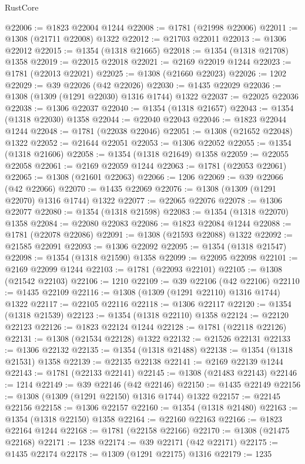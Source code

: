 \begin{lexlean}{RustCore}
\begin{coremodule}
@22006 := @1823 @22004 @1244
@22008 := @1781 (@21998 @22006)
@22011 := @1308 (@21711 @22008) @1322
@22012 := @21703 @22011
@22013 := @1306 @22012
@22015 := @1354 (@1318 @21665)
@22018 := @1354 (@1318 @21708) @1358
@22019 := @22015 @22018
@22021 := @2169 @22019 @1244
@22023 := @1781 (@22013 @22021)
@22025 := @1308 (@21660 @22023)
@22026 := 1202
@22029 := @39 @22026 (@42 @22026)
@22030 := @1435 @22029
@22036 := @1308 (@1309 (@1291 @22030) @1316 @1744) @1322
@22037 := @22025 @22036
@22038 := @1306 @22037
@22040 := @1354 (@1318 @21657)
@22043 := @1354 (@1318 @22030) @1358
@22044 := @22040 @22043
@22046 := @1823 @22044 @1244
@22048 := @1781 (@22038 @22046)
@22051 := @1308 (@21652 @22048) @1322
@22052 := @21644 @22051
@22053 := @1306 @22052
@22055 := @1354 (@1318 @21606)
@22058 := @1354 (@1318 @21649) @1358
@22059 := @22055 @22058
@22061 := @2169 @22059 @1244
@22063 := @1781 (@22053 @22061)
@22065 := @1308 (@21601 @22063)
@22066 := 1206
@22069 := @39 @22066 (@42 @22066)
@22070 := @1435 @22069
@22076 := @1308 (@1309 (@1291 @22070) @1316 @1744) @1322
@22077 := @22065 @22076
@22078 := @1306 @22077
@22080 := @1354 (@1318 @21598)
@22083 := @1354 (@1318 @22070) @1358
@22084 := @22080 @22083
@22086 := @1823 @22084 @1244
@22088 := @1781 (@22078 @22086)
@22091 := @1308 (@21593 @22088) @1322
@22092 := @21585 @22091
@22093 := @1306 @22092
@22095 := @1354 (@1318 @21547)
@22098 := @1354 (@1318 @21590) @1358
@22099 := @22095 @22098
@22101 := @2169 @22099 @1244
@22103 := @1781 (@22093 @22101)
@22105 := @1308 (@21542 @22103)
@22106 := 1210
@22109 := @39 @22106 (@42 @22106)
@22110 := @1435 @22109
@22116 := @1308 (@1309 (@1291 @22110) @1316 @1744) @1322
@22117 := @22105 @22116
@22118 := @1306 @22117
@22120 := @1354 (@1318 @21539)
@22123 := @1354 (@1318 @22110) @1358
@22124 := @22120 @22123
@22126 := @1823 @22124 @1244
@22128 := @1781 (@22118 @22126)
@22131 := @1308 (@21534 @22128) @1322
@22132 := @21526 @22131
@22133 := @1306 @22132
@22135 := @1354 (@1318 @21488)
@22138 := @1354 (@1318 @21531) @1358
@22139 := @22135 @22138
@22141 := @2169 @22139 @1244
@22143 := @1781 (@22133 @22141)
@22145 := @1308 (@21483 @22143)
@22146 := 1214
@22149 := @39 @22146 (@42 @22146)
@22150 := @1435 @22149
@22156 := @1308 (@1309 (@1291 @22150) @1316 @1744) @1322
@22157 := @22145 @22156
@22158 := @1306 @22157
@22160 := @1354 (@1318 @21480)
@22163 := @1354 (@1318 @22150) @1358
@22164 := @22160 @22163
@22166 := @1823 @22164 @1244
@22168 := @1781 (@22158 @22166)
@22170 := @1308 (@21475 @22168)
@22171 := 1238
@22174 := @39 @22171 (@42 @22171)
@22175 := @1435 @22174
@22178 := @1309 (@1291 @22175) @1316
@22179 := 1235

\end{coremodule}
\end{lexlean}
